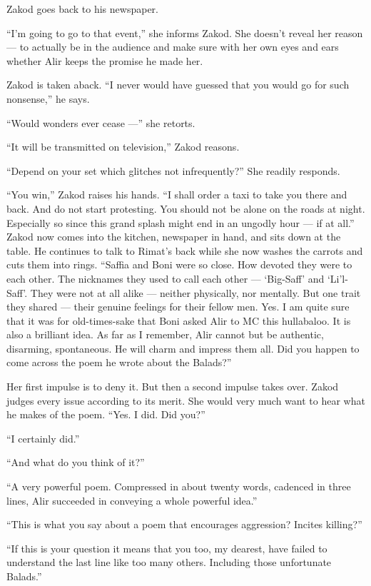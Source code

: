 \documentclass[twoside,11pt,openany]{book}
\begin{document}
Zakod goes back to his newspaper.

``I'm going to go to that event,'' she informs Zakod. She doesn't reveal her reason --- to
actually be in the audience and make sure with her own eyes and ears whether Alir keeps  the promise he made
her.{ }

Zakod is taken aback. ``I never would have guessed that you would go for such nonsense,'' he says.

``Would wonders ever cease ---'' she retorts.

``It will be transmitted on television,'' Zakod reasons.

``Depend on your set which glitches not infrequently?'' She readily responds.

``You win,'' Zakod raises his hands. ``I shall order a taxi to take you there and
back. And do not start protesting. You should not be alone on the roads at night.  Especially so since this grand
splash might end in an ungodly hour --- if at all.'' Zakod now comes into the kitchen, newspaper in hand,
and sits down at the table. He continues to talk to Rimat's back while she now washes the carrots and cuts them into
rings. ``Saffia and Boni were so close.  How devoted they were to each other{.}  The
nicknames they used to call each other --- `Big-Saff' and `Li'l-Saff'. They were not at all alike --- neither physically,
nor mentally. But one trait they shared --- their genuine feelings for their
fellow men. Yes. I am quite sure that it was for old-times-sake that Boni asked Alir to MC this hullabaloo. It is
also a brilliant idea. As far as I remember, Alir cannot but be authentic, disarming, spontaneous. He will charm and
impress them all. Did you happen to come across the poem he wrote about the Balads?''

Her first impulse is to deny it. But then a second impulse takes over. Zakod judges every issue according to its merit.
She would very much want to hear what he makes of the poem. ``Yes. I did. Did you?''

``I certainly did.''

``And what do you think of it?''

``A very powerful poem. Compressed in about twenty words, cadenced in three lines, Alir succeeded in
conveying a whole powerful idea.''

``This is what you say about a poem that encourages aggression?  Incites killing?''

``If this is your question it means that you too, my dearest, have failed to understand the last line like
too many others. Including those unfortunate Balads.''
\end{document}
